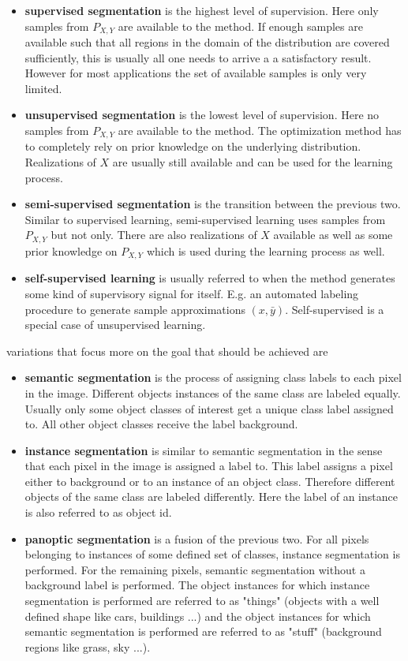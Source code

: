\begin{itemize}
	\item \textbf{supervised segmentation} is the highest level of supervision. Here only samples from $P_{X, Y}$ are available to the method. If enough samples are available such that all regions in the domain of the distribution are covered sufficiently, this is usually all one needs to arrive a a satisfactory result. However for most applications the set of available samples is only very limited.
	\item \textbf{unsupervised segmentation} is the lowest level of supervision. Here no samples from $P_{X, Y}$ are available to the method. The optimization method has to completely rely on prior knowledge on the underlying distribution. Realizations of $X$ are usually still available and can be used for the learning process.
	\item \textbf{semi-supervised segmentation} is the transition between the previous two. Similar to supervised learning, semi-supervised learning uses samples from $P_{X, Y}$ but not only. There are also realizations of $X$ available as well as some prior knowledge on $P_{X, Y}$ which is used during the learning process as well.
	\item \textbf{self-supervised learning} is usually referred to when the method generates some kind of supervisory signal for itself. E.g. an automated labeling procedure to generate sample approximations $(x, \bar{y})$. Self-supervised is a special case of unsupervised learning.
\end{itemize}

variations that focus more on the goal that should be achieved are

\begin{itemize}
	\item \textbf{semantic segmentation} is the process of assigning class labels to each pixel in the image. Different objects instances of the same class are labeled equally. Usually only some object classes of interest get a unique class label assigned to. All other object classes receive the label background.
	\item \textbf{instance segmentation} is similar to semantic segmentation in the sense that each pixel in the image is assigned a label to. This label assigns a pixel either to background or to an instance of an object class. Therefore different objects of the same class are labeled differently. Here the label of an instance is also referred to as object id.
	\item \textbf{panoptic segmentation} is a fusion of the previous two. For all pixels belonging to instances of some defined set of classes, instance segmentation is performed. For the remaining pixels, semantic segmentation without a background label is performed. The object instances for which instance segmentation is performed are referred to as "things" (objects with a well defined shape like cars, buildings ...) and the object instances for which semantic segmentation is performed are referred to as "stuff" (background regions like grass, sky ...).
\end{itemize}